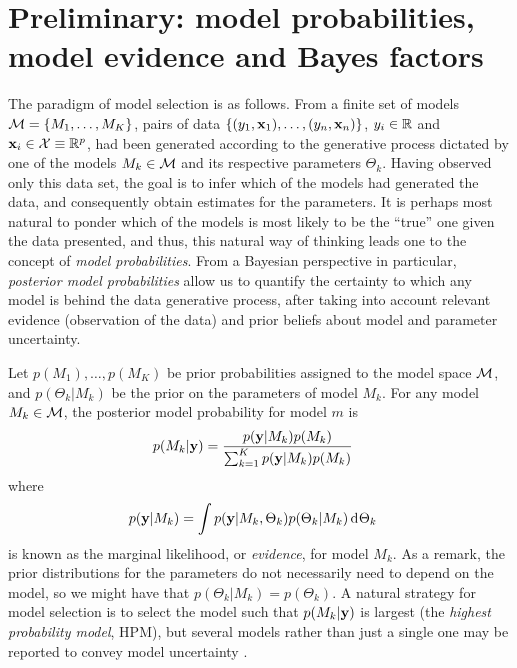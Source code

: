 \documentclass[showframe,11pt,twoside,openright]{report}
\begin{document}
\section{Preliminary: model probabilities, model evidence and Bayes factors}

The paradigm of model selection is as follows. 
From a finite set of models ${\mathcal M} = \{M_1,\dots,M_K\}$, pairs of data $\{(y_1,{\mathbf x}_1),\dots,(y_n,{\mathbf x}_n)\}$, $y_i\in\mathbb{R}$ and ${\mathbf x}_i\in{\mathcal X}\equiv\mathbb{R}^p$, had been generated according to the generative process dictated by one of the models $M_k \in {\mathcal M}$ and its respective parameters $\Theta_k$.
Having observed only this data set, the goal is to infer which of the models had generated the data, and consequently obtain estimates for the parameters.
It is perhaps most natural to ponder which of the models is most likely to be the ``true'' one given the data presented, and thus, this natural way of thinking leads one to the concept of \emph{model probabilities}.
From a Bayesian perspective in particular, \emph{posterior model probabilities} allow us to quantify the certainty to which any model is behind the data generative process, after taking into account relevant evidence (observation of the data) and prior beliefs about model and parameter uncertainty.

Let $p(M_1),\dots,p(M_K)$ be prior probabilities assigned to the model space ${\mathcal M}$, and $p(\Theta_k|M_k)$ be the prior on the parameters of model $M_k$.
For any model $M_k \in {\mathcal M}$, the posterior model probability for model $m$ is
\begin{align}\label{eq:pmp}
  p(M_k|{\mathbf y}) 
  &=\frac{p({\mathbf y}|M_k)p(M_k)}{\sum_{k=1}^K p({\mathbf y}|M_k)p(M_k) } 
\end{align}
where 
\begin{align}\label{eq:modelevidence2}
  p({\mathbf y}|M_k)
  &= \int p({\mathbf y}|M_k,\Theta_k)p(\Theta_k|M_k) \operatorname{d}\hspace{0.5pt}\!\Theta_k
\end{align}
is known as the marginal likelihood, or \emph{evidence}, for model $M_k$.
As a remark, the prior distributions for the parameters do not necessarily need to depend on the model, so we might have that $p(\Theta_k|M_k)=p(\Theta_k)$.
A natural strategy for model selection is to select the model such that $p(M_k|{\mathbf y})$ is largest (the \emph{highest probability model}, HPM), but several models rather than just a single one may be reported to convey model uncertainty \citep{Chipman2001}.
\end{document}
